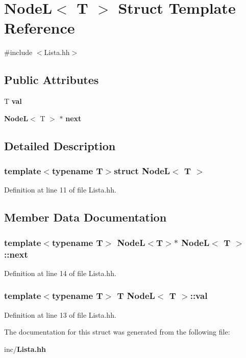 \section{Node\-L$<$ T $>$ Struct Template Reference}
\label{struct_node_l}


{\ttfamily \#include $<$Lista.\-hh$>$}

\subsection*{Public Attributes}
\begin{DoxyCompactItemize}
\item 
T {\bf val}
\item 
{\bf Node\-L}$<$ T $>$ $\ast$ {\bf next}
\end{DoxyCompactItemize}


\subsection{Detailed Description}
\subsubsection*{template$<$typename T$>$struct Node\-L$<$ T $>$}



Definition at line 11 of file Lista.\-hh.



\subsection{Member Data Documentation}
\subsubsection[{next}]{\setlength{\rightskip}{0pt plus 5cm}template$<$typename T$>$ {\bf Node\-L}$<$T$>$$\ast$ {\bf Node\-L}$<$ T $>$\-::next}\label{struct_node_l_a0c3afc9e532c18b261ead8ee2218100d}


Definition at line 14 of file Lista.\-hh.

\subsubsection[{val}]{\setlength{\rightskip}{0pt plus 5cm}template$<$typename T$>$ T {\bf Node\-L}$<$ T $>$\-::val}\label{struct_node_l_af8d6352b8a3b463d1a1f2dc9fa6378d6}


Definition at line 13 of file Lista.\-hh.



The documentation for this struct was generated from the following file\-:\begin{DoxyCompactItemize}
\item 
inc/{\bf Lista.\-hh}\end{DoxyCompactItemize}
